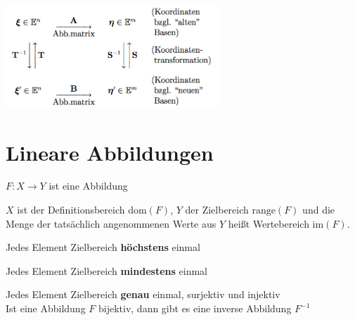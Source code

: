 \documentclass[a4paper,twocolumn]{article}
\begin{document}
		\begin{fmerke}
			\begin{center}
				\includegraphics[width=8cm]{basiswechsel}
			\end{center}
			\vspace{-2mm}
		\end{fmerke}
\section{Lineare Abbildungen}

	\begin{fdef}[Abbildung]
		$F: X \to Y$ ist eine Abbildung
	\end{fdef}
	
	$X$ ist der Definitionsbereich $\text{dom}(F)$, $Y$ der Zielbereich $\text{range}(F)$ und die Menge der tatsächlich angenommenen Werte aus $Y$ heißt Wertebereich $\text{im}(F)$. 
	
		\begin{feig}[\begin{tabular*}{\textwidth}{@{\extracolsep{0mm}}l@{\extracolsep{\fill}}c@{\extracolsep{0mm}}r}injektiv & $\forall x_1, x_2 \in X : (f(x_1)= f(x_2)) \Rightarrow x_1=x_2$\end{tabular*}]
			Jedes Element Zielbereich \textbf{höchstens} einmal\\[-3.5mm]
		\end{feig}
	\begin{feig}[\begin{tabular*}{\textwidth}{@{\extracolsep{0mm}}l@{\extracolsep{\fill}}c@{\extracolsep{0mm}}r}surjektiv & $\forall y \in Y \ \exists x \in X : f(x)=y$\end{tabular*}]
			Jedes Element Zielbereich \textbf{mindestens} einmal
		\end{feig}
	\begin{feig}
		Jedes Element Zielbereich \textbf{genau} einmal, surjektiv und injektiv\\
		Ist eine Abbildung $F$ bijektiv, dann gibt es eine inverse Abbildung $F^{-1}$
	\end{feig}
	
\end{document}
